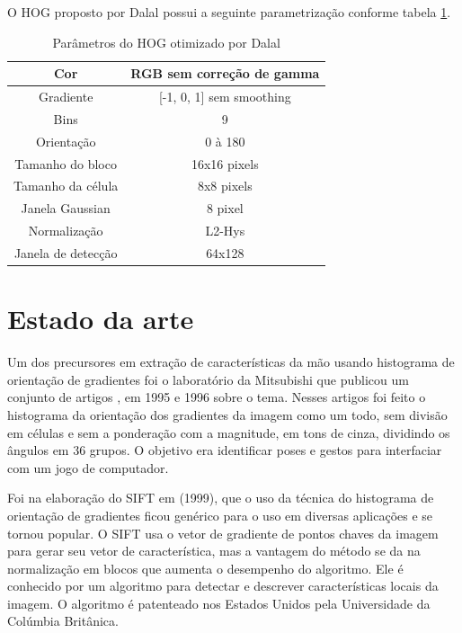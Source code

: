 O HOG proposto por Dalal \cite{dalal} possui a seguinte parametrização conforme tabela \ref{table:dlal_hog}.

\begin{table}[H]
\centering
\begin{tabular}{|c|c|}
\hline Cor & RGB sem correção de gamma \\ 
\hline Gradiente & [-1, 0, 1] sem smoothing \\ 
\hline Bins & 9 \\
\hline Orientação & 0 à 180 \\
\hline Tamanho do bloco & 16x16 pixels \\
\hline Tamanho da célula & 8x8 pixels \\
\hline Janela Gaussian & 8 pixel \\
\hline Normalização & L2-Hys \\
\hline Janela de detecção & 64x128 \\
\hline 
\end{tabular} 
\caption{Parâmetros do HOG otimizado por Dalal}
\label{table:dlal_hog}
\end{table}

\section{Estado da arte}

Um dos precursores em extração de características da mão usando histograma de orientação de gradientes foi o laboratório da Mitsubishi que publicou um conjunto de artigos \cite{ref3}, \cite{ref4} em 1995 e 1996 sobre o tema. Nesses artigos foi feito o histograma da orientação dos gradientes da imagem como um todo, sem divisão em células e sem a ponderação com a magnitude, em tons de cinza, dividindo os ângulos em 36 grupos. O objetivo era identificar poses e gestos para interfaciar com um jogo de computador. 

Foi na elaboração do SIFT em \cite{ref15} (1999), que o uso da técnica do histograma de orientação de gradientes ficou genérico para o uso em diversas aplicações e se tornou popular. O SIFT usa o vetor de gradiente de pontos chaves da imagem para gerar seu vetor de característica, mas a vantagem do método se da na normalização em blocos que aumenta o desempenho do algoritmo. Ele é conhecido por um algoritmo para detectar e descrever características locais da imagem. O algoritmo é patenteado nos Estados Unidos pela Universidade da Colúmbia Britânica.

